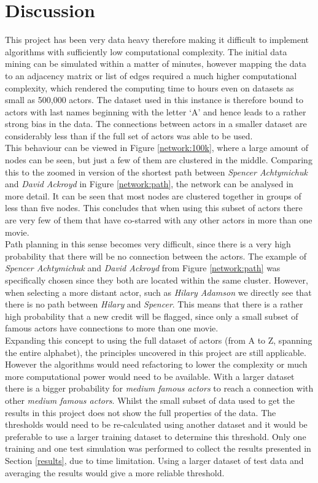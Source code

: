 \documentclass[12pt]{ieeeconf}      %
\begin{document}
\section{Discussion}
\indent This project has been very data heavy therefore making it difficult to implement algorithms with sufficiently low computational complexity. The initial data mining can be simulated within a matter of minutes, however mapping the data to an adjacency matrix or list of edges required a much higher computational complexity, which rendered the computing time to hours even on datasets as small as 500,000 actors. The dataset used in this instance is therefore bound to actors with last names beginning with the letter `A' and hence leads to a rather strong bias in the data. The connections between actors in a smaller dataset are considerably less than if the full set of actors was able to be used. 
\\
\indent This behaviour can be viewed in Figure \ref{network:100k}, where a large amount of nodes can be seen, but just a few of them are clustered in the middle. Comparing this to the zoomed in version of the shortest path between \textit{Spencer Achtymichuk} and \textit{David Ackroyd} in Figure \ref{network:path}, the network can be analysed in more detail. It can be seen that most nodes are clustered together in groups of less than five nodes. This concludes that when using this subset of actors there are very few of them that have co-starred with any other actors in more than one movie.
\\
\indent Path planning in this sense becomes very difficult, since there is a very high probability that there will be no connection between the actors. The example of \textit{Spencer Achtymichuk} and \textit{David Ackroyd} from Figure \ref{network:path} was specifically chosen since they both are located within the same cluster. However, when selecting a more distant actor, such as \textit{Hilary Adamson} we directly see that there is no path between \textit{Hilary} and \textit{Spencer}. This means that there is a rather high probability that a new credit will be flagged, since only a small subset of famous actors have connections to more than one movie.
\\
\indent Expanding this concept to using the full dataset of actors (from A to Z, spanning the entire alphabet), the principles uncovered in this project are still applicable. However the algorithms would need refactoring to lower the complexity or much more computational power would need to be available. With a larger dataset there is a bigger probability for \textit{medium famous actors} to reach a connection with other \textit{medium famous actors}. Whilst the small subset of data used to get the results in this project does not show the full properties of the data. The thresholds would need to be re-calculated using another dataset and it would be preferable to use a larger training dataset to determine this threshold. Only one training and one test simulation was performed to collect the results presented in Section \ref{results}, due to time limitation. Using a larger dataset of test data and averaging the results would give a more reliable threshold. 
\end{document}
